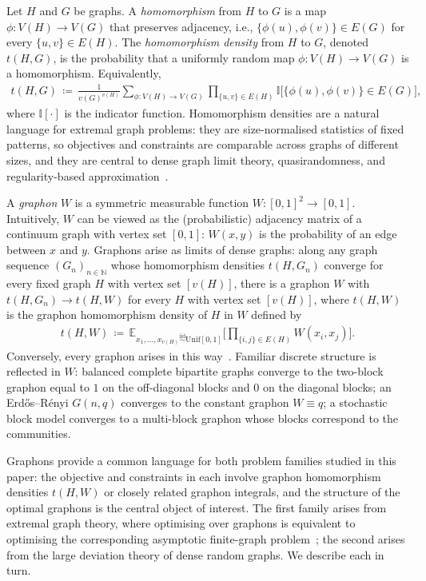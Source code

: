 \documentclass{article}
\theoremstyle{plain}
\theoremstyle{definition}
\theoremstyle{remark}
\begin{document}
Let $H$ and $G$ be graphs. A \emph{homomorphism} from $H$ to $G$ is a map $\phi : V(H) \to V(G)$ that preserves adjacency, i.e., $\{\phi(u), \phi(v)\} \in E(G)$ for every $\{u,v\} \in E(H)$. The \emph{homomorphism density} from $H$ to $G$, denoted $t(H, G)$, is the probability that a uniformly random map $\phi : V(H) \to V(G)$ is a homomorphism. Equivalently,
\begin{align}
t(H, G) \,\coloneqq\, {}
\label{eqn:homomorphismdensity}
\frac{1}{v(G)^{v(H)}}
\sum_{\phi : V(H) \to V(G)}
\prod_{\{u,v\} \in E(H)} \mathbb{I}\bigl[\{\phi(u), \phi(v)\} \in E(G)\bigr],
\end{align}
where $\mathbb{I}[\cdot]$ is the indicator function.
Homomorphism densities are a natural language for extremal graph problems: they are size-normalised statistics of fixed patterns, so objectives and constraints are comparable across graphs of different sizes, and they are central to dense graph limit theory, quasirandomness, and regularity-based approximation~\citep{lovasz2012large}.

A \emph{graphon} $W$ is a symmetric measurable function $W : [0,1]^2 \to [0,1]$. Intuitively, $W$ can be viewed as the (probabilistic) adjacency matrix of a continuum graph with vertex set $[0,1]$: $W(x,y)$ is the probability of an edge between $x$ and $y$. Graphons arise as limits of dense graphs: along any graph sequence $(G_n)_{n \in \mathbb{N}}$ whose homomorphism densities $t(H, G_n)$ converge for every fixed graph $H$ with vertex set $[v(H)]$, there is a graphon $W$ with $t(H, G_n) \to t(H, W)$ for every $H$ with vertex set $[v(H)]$, where
$t(H,W)$ is the graphon homomorphism density of $H$ in $W$ defined by
\begin{align}
t(H, W) \,\coloneqq\, \mathbb{E}_{x_1, \ldots, x_{v(H)} \stackrel{\mathrm{iid}}{\sim} \mathrm{Unif}[0,1]}
\Big[ \prod_{\{i,j\} \in E(H)} W(x_i, x_j)\Big].
\label{eqn:homomorphismdensitygraphon}
\end{align}
Conversely, every graphon arises in this way~\citep{lovasz2006limits,lovasz2012large}. Familiar discrete structure is reflected in $W$: balanced complete bipartite graphs converge to the two-block graphon equal to $1$ on the off-diagonal blocks and $0$ on the diagonal blocks; an Erd\H{o}s--R\'enyi $G(n,q)$ converges to the constant graphon $W \equiv q$; a stochastic block model converges to a multi-block graphon whose blocks correspond to the communities. 

Graphons provide a common language for both problem families studied in this paper: the objective and constraints in each involve graphon homomorphism densities $t(H,W)$ or closely related graphon integrals, and the structure of the optimal graphons is the central object of interest. The first family arises from extremal graph theory, where optimising over graphons is equivalent to optimising the corresponding asymptotic finite-graph problem~\citep{lovasz2012large}; the second arises from the large deviation theory of dense random graphs. We describe each in turn.
\end{document}
